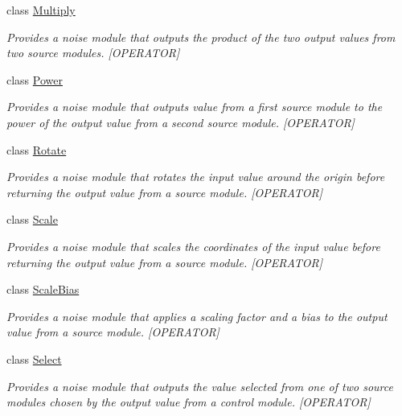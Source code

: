 \begin{DoxyCompactItemize}
class \hyperlink{class_lib_noise_1_1_operator_1_1_multiply}{Multiply}
\begin{DoxyCompactList}\small\item\em Provides a noise module that outputs the product of the two output values from two source modules. \mbox{[}O\+P\+E\+R\+A\+T\+OR\mbox{]} \end{DoxyCompactList}\item 
class \hyperlink{class_lib_noise_1_1_operator_1_1_power}{Power}
\begin{DoxyCompactList}\small\item\em Provides a noise module that outputs value from a first source module to the power of the output value from a second source module. \mbox{[}O\+P\+E\+R\+A\+T\+OR\mbox{]} \end{DoxyCompactList}\item 
class \hyperlink{class_lib_noise_1_1_operator_1_1_rotate}{Rotate}
\begin{DoxyCompactList}\small\item\em Provides a noise module that rotates the input value around the origin before returning the output value from a source module. \mbox{[}O\+P\+E\+R\+A\+T\+OR\mbox{]} \end{DoxyCompactList}\item 
class \hyperlink{class_lib_noise_1_1_operator_1_1_scale}{Scale}
\begin{DoxyCompactList}\small\item\em Provides a noise module that scales the coordinates of the input value before returning the output value from a source module. \mbox{[}O\+P\+E\+R\+A\+T\+OR\mbox{]} \end{DoxyCompactList}\item 
class \hyperlink{class_lib_noise_1_1_operator_1_1_scale_bias}{Scale\+Bias}
\begin{DoxyCompactList}\small\item\em Provides a noise module that applies a scaling factor and a bias to the output value from a source module. \mbox{[}O\+P\+E\+R\+A\+T\+OR\mbox{]} \end{DoxyCompactList}\item 
class \hyperlink{class_lib_noise_1_1_operator_1_1_select}{Select}
\begin{DoxyCompactList}\small\item\em Provides a noise module that outputs the value selected from one of two source modules chosen by the output value from a control module. \mbox{[}O\+P\+E\+R\+A\+T\+OR\mbox{]} \end{DoxyCompactList}\item 

\end{DoxyCompactItemize}
